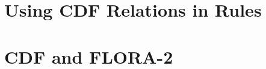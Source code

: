 \section{Using CDF Relations in Rules}

\section{CDF and FLORA-2}

\newcommand{\fd}{\ensuremath{{\rightarrow}}}                   %
\newcommand{\bfd}{\ensuremath{{\bullet\!\!\!\fd}}}            %
\newcommand{\mvd}{\ensuremath{{\rightarrow\!\!\!\!\rightarrow}}}  %
\newcommand{\bmvd}{\ensuremath{{\bullet\!\!\!\mvd}}}              %
\newcommand{\Fd}{\ensuremath{{\Rightarrow}}}                      %
\newcommand{\Mvd}{\ensuremath{{\Rightarrow\!\!\!\!\Rightarrow}}}  %
\newcommand{\isa}{\,{\bf{:}}\,}
\newcommand{\subcl}{\,{\bf{::}}\,}

